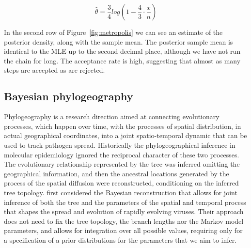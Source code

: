\begin{equation}
\hat{\theta}=\frac{3}{4}log\left(1-\frac{4}{3}\cdot\frac{x}{n}\right)
\label{eq:mle}
\end{equation}

In the second row of Figure~\ref{fig:metropolis} we can see an estimate of the posterior density, along with the sample mean.
The posterior sample mean is identical to the MLE up to the second decimal place, although we have not run the chain for long.
The acceptance rate is high, suggesting that almost as many steps are accepted as are rejected.


\subsection{Bayesian phylogeography\label{sub:phylogeo}}

Phylogeography is a research direction aimed at connecting evolutionary processes, which happen over time, with the processes of spatial distribution, in actual geographical coordinates, into a joint spatio-temporal dynamic that can be used to track pathogen spread.
Historically the phylogeographical inference in molecular epidemiology ignored the reciprocal character of these two processes. 
The evolutionary relationship represented by the tree was inferred omitting the geographical information, and then the ancestral locations generated by the process of the spatial diffusion were reconstructed, conditioning on the inferred tree topology.
\citet{Lemey2009} first considered the Bayesian reconstruction that allows for joint inference of both the tree and the parameters of the spatial and temporal process that shapes the spread and evolution of 
rapidly evolving viruses.
Their approach does not need to fix the tree topology, the branch lengths nor the Markov model parameters, and allows for integration over all possible values, requiring only for a specification of a prior distributions for the parameters that we aim to infer.

